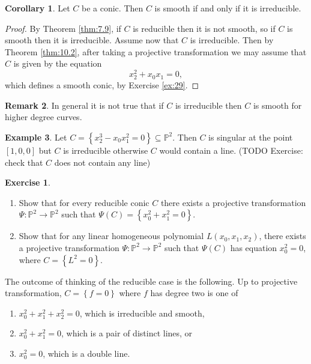 \documentclass{article}
\renewcommand{\P}{\mathbb{P}}
\newcommand{\rb}[1]{\left( #1 \right)}
\renewcommand{\sb}[1]{\left[ #1 \right]}
\newcommand{\cb}[1]{\left\{ #1 \right\}}
\theoremstyle{definition}\newtheorem{definition}{Definition}[section]
\theoremstyle{definition}\newtheorem{notation}[definition]{Notation}
\theoremstyle{definition}\newtheorem{remark}[definition]{Remark}
\theoremstyle{definition}\newtheorem{example}[definition]{Example}
\theoremstyle{definition}\newtheorem{fact}{Fact}
\theoremstyle{definition}\newtheorem{exercise}{Exercise}
\newtheorem{corollary}[definition]{Corollary}
\begin{document}
\begin{corollary}
\label{cor:10.4}
Let $ C $ be a conic. Then $ C $ is smooth if and only if it is irreducible.
\end{corollary}

\begin{proof}
By Theorem \ref{thm:7.9}, if $ C $ is reducible then it is not smooth, so if $ C $ is smooth then it is irreducible. Assume now that $ C $ is irreducible. Then by Theorem \ref{thm:10.2}, after taking a projective transformation we may assume that $ C $ is given by the equation
$$ x_2^2 + x_0x_1 = 0, $$
which defines a smooth conic, by Exercise \ref{ex:29}.
\end{proof}

\begin{remark}
In general it is not true that if $ C $ is irreducible then $ C $ is smooth for higher degree curves.
\end{remark}

\begin{example}
Let $ C = \cb{x_2^3 - x_0x_1^2 = 0} \subseteq \P^2 $. Then $ C $ is singular at the point $ \sb{1, 0, 0} $ but $ C $ is irreducible otherwise $ C $ would contain a line. (TODO Exercise: check that $ C $ does not contain any line)
\end{example}

\begin{exercise}
\label{ex:30}
\hfill
\begin{enumerate}
\item Show that for every reducible conic $ C $ there exists a projective transformation $ \Psi : \P^2 \to \P^2 $ such that $ \Psi\rb{C} = \cb{x_0^2 + x_1^2 = 0} $.
\item Show that for any linear homogeneous polynomial $ L\rb{x_0, x_1, x_2} $, there exists a projective transformation $ \Psi : \P^2 \to \P^2 $ such that $ \Psi\rb{C} $ has equation $ x_0^2 = 0 $, where $ C = \cb{L^2 = 0} $.
\end{enumerate}
\end{exercise}

The outcome of thinking of the reducible case is the following. Up to projective transformation, $ C = \cb{f = 0} $ where $ f $ has degree two is one of
\begin{enumerate}
\item $ x_0^2 + x_1^2 + x_2^2 = 0 $, which is irreducible and smooth,
\item $ x_0^2 + x_1^2 = 0 $, which is a pair of distinct lines, or
\item $ x_0^2 = 0 $, which is a double line.
\end{enumerate}
\end{document}

